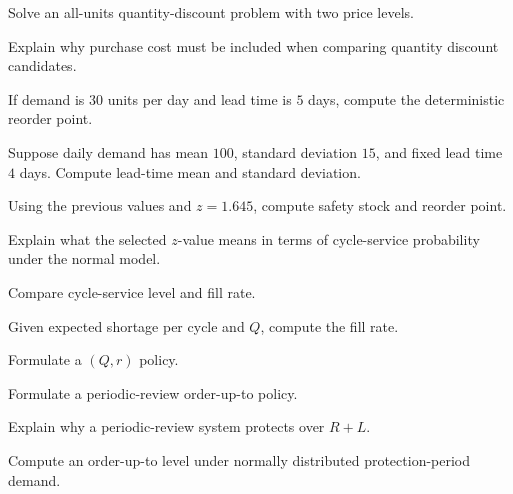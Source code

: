 \begin{exercise}[3]
Solve an all-units quantity-discount problem with two price levels.
\end{exercise}

\begin{exercise}[3]
Explain why purchase cost must be included when comparing quantity
discount candidates.
\end{exercise}

\begin{exercise}[2]
If demand is \(30\) units per day and lead time is \(5\) days, compute the
deterministic reorder point.
\end{exercise}

\begin{exercise}[3]
Suppose daily demand has mean \(100\), standard deviation \(15\), and fixed
lead time \(4\) days. Compute lead-time mean and standard deviation.
\end{exercise}

\begin{exercise}[3]
Using the previous values and \(z=1.645\), compute safety stock and reorder
point.
\end{exercise}

\begin{exercise}[3]
Explain what the selected \(z\)-value means in terms of cycle-service
probability under the normal model.
\end{exercise}

\begin{exercise}[3]
Compare cycle-service level and fill rate.
\end{exercise}

\begin{exercise}[3]
Given expected shortage per cycle and \(Q\), compute the fill rate.
\end{exercise}

\begin{exercise}[3]
Formulate a \((Q,r)\) policy.
\end{exercise}

\begin{exercise}[3]
Formulate a periodic-review order-up-to policy.
\end{exercise}

\begin{exercise}[3]
Explain why a periodic-review system protects over \(R+L\).
\end{exercise}

\begin{exercise}[3]
Compute an order-up-to level under normally distributed protection-period
demand.
\end{exercise}

